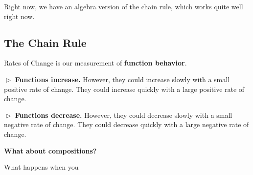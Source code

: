 \documentclass{ximera}
\begin{document}
Right now, we have an algebra version of the chain rule, which works quite well right now.










































\subsection*{The Chain Rule}





















Rates of Change is our measurement of \textbf{function behavior}.


$\vartriangleright$  \textbf{\textcolor{blue!55!black}{Functions increase.}}  However, they could increase slowly with a small positive rate of change.  They could increase quickly with a large positive rate of change. 



$\vartriangleright$  \textbf{\textcolor{blue!55!black}{Functions decrease.}}  However, they could decrease slowly with a small negative rate of change.  They could decrease quickly with a large negative rate of change. 





\textbf{\textcolor{purple!85!blue}{What about compositions?}}





What happens when you
\end{document}
